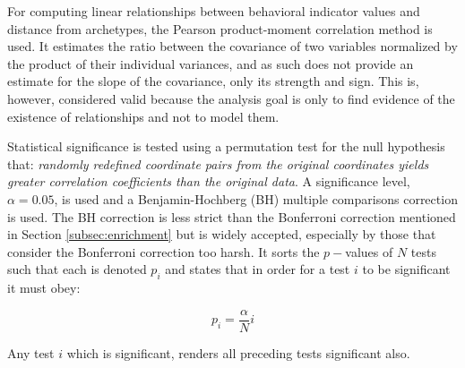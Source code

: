For computing linear relationships between behavioral indicator values and distance from archetypes, the Pearson product-moment correlation method is used. It estimates the ratio between the covariance of two variables normalized by the product of their individual variances, and as such does not provide an estimate for the slope of the covariance, only its strength and sign. This is, however, considered valid because the analysis goal is only to find evidence of the existence of relationships and not to model them.

Statistical significance is tested using a permutation test for the null hypothesis that: \textit{randomly redefined coordinate pairs from the original coordinates yields greater correlation coefficients than the original data}. A significance level, $\alpha = 0.05$, is used and a Benjamin-Hochberg (BH) multiple comparisons correction is used. The BH correction is less strict than the Bonferroni correction mentioned in Section \ref{subsec:enrichment} but is widely accepted, especially by those that consider the Bonferroni correction too harsh. It sorts the $p-$values of $N$ tests such that each is denoted $p_i$ and states that in order for a test $i$ to be significant it must obey:

\begin{equation}
	p_i = \frac{\alpha}{N} i
\end{equation}

Any test $i$ which is significant, renders all preceding tests significant also.
